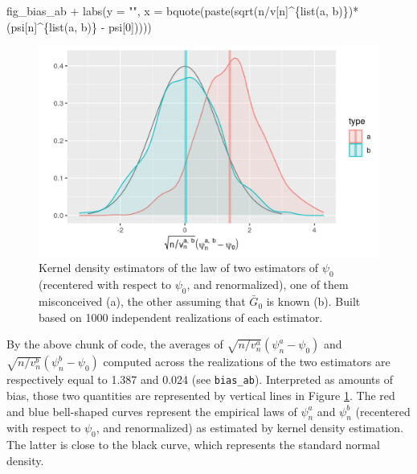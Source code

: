 \documentclass[
  11pt,
  openright,twoside]{book}
\newenvironment{Shaded}{\begin{snugshade}}{\end{snugshade}}
\newcommand{\AttributeTok}[1]{\textcolor[rgb]{0.77,0.63,0.00}{#1}}
\newcommand{\DecValTok}[1]{\textcolor[rgb]{0.00,0.00,0.81}{#1}}
\newcommand{\FunctionTok}[1]{\textcolor[rgb]{0.00,0.00,0.00}{#1}}
\newcommand{\NormalTok}[1]{#1}
\newcommand{\SpecialCharTok}[1]{\textcolor[rgb]{0.00,0.00,0.00}{#1}}
\newcommand{\StringTok}[1]{\textcolor[rgb]{0.31,0.60,0.02}{#1}}
\newcommand{\Gbar}{\bar{G}}
\theoremstyle{definition}
\theoremstyle{definition}
\theoremstyle{definition}
\theoremstyle{definition}
\theoremstyle{remark}
\begin{document}
\begin{Shaded}
\begin{Highlighting}[]
\NormalTok{fig\_bias\_ab }\SpecialCharTok{+}
  \FunctionTok{labs}\NormalTok{(}\AttributeTok{y =} \StringTok{""}\NormalTok{,}
       \AttributeTok{x =} \FunctionTok{bquote}\NormalTok{(}\FunctionTok{paste}\NormalTok{(}\FunctionTok{sqrt}\NormalTok{(n}\SpecialCharTok{/}\NormalTok{v[n]}\SpecialCharTok{\^{}}\NormalTok{\{}\FunctionTok{list}\NormalTok{(a, b)\})}\SpecialCharTok{*}
\NormalTok{                        (psi[n]}\SpecialCharTok{\^{}}\NormalTok{\{}\FunctionTok{list}\NormalTok{(a, b)\} }\SpecialCharTok{{-}}\NormalTok{ psi[}\DecValTok{0}\NormalTok{]))))}
\end{Highlighting}
\end{Shaded}

\begin{figure}

{\centering \includegraphics[width=0.7\linewidth]{img/known-Gbar-one-b-1} 

}

\caption{Kernel density estimators of the law of two estimators of \(\psi_{0}\) (recentered with respect to \(\psi_{0}\), and renormalized), one of them misconceived (a), the other assuming that \(\Gbar_{0}\) is known (b). Built based on 1000 independent realizations of each estimator.}\label{fig:known-Gbar-one-b}
\end{figure}

By the above chunk of code, the averages of \(\sqrt{n/v_{n}^{a}} (\psi_{n}^{a} - \psi_{0})\) and \(\sqrt{n/v_{n}^{b}} (\psi_{n}^{b} - \psi_{0})\)
computed across the realizations of the two estimators are respectively equal
to 1.387 and
0.024 (see \texttt{bias\_ab}). Interpreted as amounts of bias, those two
quantities are represented by vertical lines in Figure
\ref{fig:known-Gbar-one-b}. The red and blue bell-shaped curves represent the
empirical laws of \(\psi_{n}^{a}\) and \(\psi_{n}^{b}\) (recentered with respect
to \(\psi_{0}\), and renormalized) as estimated by kernel density estimation.
The latter is close to the black curve, which represents the standard normal
density.
\end{document}
